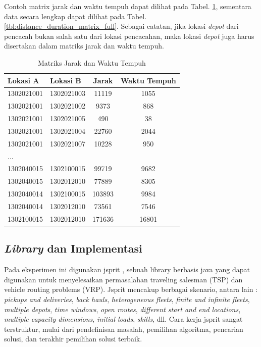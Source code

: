 Contoh matrix jarak dan waktu tempuh dapat dilihat pada Tabel. \ref{tbl:distance_duration_matrix}, sementara data secara lengkap dapat dilihat pada Tabel. \ref{tbl:distance_duration_matrix_full}. Sebagai catatan, jika lokasi \textit{depot} dari pencacah bukan salah satu dari lokasi pencacahan, maka lokasi \textit{depot} juga harus disertakan dalam matriks jarak dan waktu tempuh.


\begin{table}\centering
{}
\caption{Matriks Jarak dan Waktu Tempuh}
\label{tbl:distance_duration_matrix}
\begin{tabular}{llcc}
\toprule
Lokasi A & Lokasi B & Jarak & Waktu Tempuh\\
\midrule
1302021001 & 1302021003 & 11119 & 1055\\
1302021001 & 1302021002 & 9373 & 868\\
1302021001 & 1302021005 & 490 & 38\\
1302021001 & 1302021004 & 22760 & 2044\\
1302021001 & 1302021007 & 10228 & 950\\
...\\
1302040015 & 1302100015 & 99719 & 9682\\
1302040015 & 1302012010 & 77889 & 8305\\
1302040014 & 1302100015 & 103893 & 9984\\
1302040014 & 1302012010 & 73561 & 7546\\
1302100015 & 1302012010 & 171636 & 16801\\
\bottomrule
\end{tabular}
\end{table}


\subsection{\textit{Library} dan Implementasi}

Pada eksperimen ini digunakan jsprit \citep{jsprit_jsprit_2014}, sebuah library berbasis java yang dapat digunakan untuk menyelesaikan permasalahan traveling salesman (TSP) dan vehicle routing problems (VRP). Jsprit mencakup berbagai skenario, antara lain : \textit{pickups and deliveries}, \textit{back hauls}, \textit{heterogeneous fleets}, \textit{finite and infinite fleets}, \textit{multiple depots}, \textit{time windows}, \textit{open routes}, \textit{different start and end locations}, \textit{multiple capacity dimensions}, \textit{initial loads}, \textit{skills}, dll. Cara kerja jsprit sangat terstruktur, mulai dari pendefinisan masalah, pemilihan algoritma, pencarian solusi, dan terakhir pemilihan solusi terbaik.


